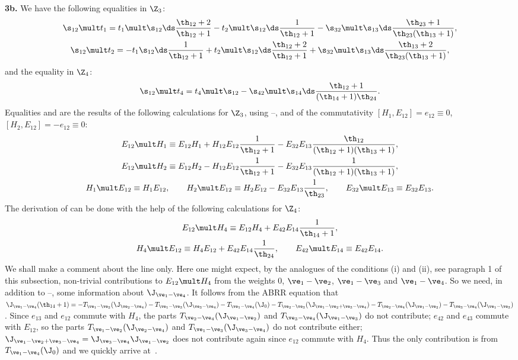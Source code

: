 {\bf 3b.} We have the following equalities in $\Z_3$:
\begin{gather}\label{proof15}
\s_{12}\mult t_1=t_1\mult\s_{12}  {\ds\frac{\th_{12}+2}{\th_{12}+1}}-t_2\mult\s_{12}  {\ds\frac{1}{\th_{12}+1}}
-\s_{32}\mult\s_{13}  {\ds\frac{\th_{23}+1}{\th_{23}(\th_{13}+1)}}  ,\\
\label{proof16}
\s_{12}\mult t_2=-t_1\s_{12}  {\ds\frac{1}{\th_{12}+1}}+t_2\mult\s_{12}
 {\ds\frac{\th_{12}+2}{\th_{12}+1}}+\s_{32}\mult\s_{13}  {\ds\frac{\th_{13}+2}{\th_{23}(\th_{13}+1)}}  ,
\end{gather}
and the equality in $\Z_4$:
\begin{gather}\label{proof17}
\s_{12}\mult t_4=t_4\mult\s_{12}-\s_{42}\mult\s_{14}  {\ds\frac{\th_{12}+1}{(\th_{14}+1)\th_{24}}}  .
\end{gather}
Equalities  and  are the results of the following calculations for $\Z_3$,
using --, and of the commutativity $[H_1,E_{12}]=e_{12}\equiv 0$,
$[H_2,E_{12}]=-e_{12}\equiv 0$:
\begin{gather*}E_{12}\mult H_1 \equiv E_{12}H_1+H_{12}E_{12}  \frac{1}{\th_{12}+1}-
E_{32}E_{13}  \frac{\th_{12}}{(\th_{12}+1)(\th_{13}+1)}  , \\
 E_{12}\mult H_2 \equiv E_{12}H_2-H_{12}E_{12}  \frac{1}{\th_{12}+1}-
E_{32}E_{13}  \frac{1}{(\th_{12}+1)(\th_{13}+1)}, \\
 H_1\mult E_{12} \equiv H_1E_{12}  , \qquad
 H_2\mult E_{12} \equiv H_2E_{12}-E_{32}E_{13}  \frac{1}{\th_{23}} , \qquad
 E_{32}\mult E_{13} \equiv E_{32}E_{13}  .\end{gather*}
The derivation of  can be done with the help of the following calculations for $\Z_4$:
\begin{gather}\label{pr14n}
E_{12}\mult H_4 \equiv E_{12}H_4+E_{42}E_{14}  \frac{1}{\th_{14}+1},\\
 H_4\mult E_{12} \equiv H_4E_{12}+E_{42}E_{14}  \frac{1}{\th_{24}}  ,\qquad
 E_{42}\mult E_{14} \equiv E_{42}E_{14}  .\nonumber
 \end{gather}
We shall make a comment about the line  only. Here one might expect, by  the analogues of the conditions (i) and (ii), see paragraph 1 of this subsection,
non-trivial contributions to $E_{12}\mult H_4$ from the weights 0, $\ve_1-\ve_2$, $\ve_1-\ve_3$ and $\ve_1-\ve_4$.
So we need, in addition to --, some information about
$\J_{\ve_1-\ve_4}$. It follows from the ABRR equation that $\J_{\ve_1-\ve_4}(\th_{14}+1)=-T_{\ve_1-\ve_2}(\J_{\ve_2-\ve_4})
-T_{\ve_1-\ve_3}(\J_{\ve_3-\ve_4})-T_{\ve_1-\ve_4}(\J_0)-T_{\ve_2-\ve_3}(\J_{\ve_1-\ve_2+\ve_3-\ve_4})-
T_{\ve_2-\ve_4}(\J_{\ve_1-\ve_2})-T_{\ve_3-\ve_4}(\J_{\ve_1-\ve_3})$. Since $e_{13}$ and $e_{12}$
commute with $H_4$, the parts $T_{\ve_2-\ve_4}(\J_{\ve_1-\ve_2})$ and $T_{\ve_3-\ve_4}(\J_{\ve_1-\ve_3})$
do not contribute; $e_{42}$ and $e_{43}$ commute with $E_{12}$, so the parts  $T_{\ve_1-\ve_2}(\J_{\ve_2-\ve_4})$
and $T_{\ve_1-\ve_3}(\J_{\ve_3-\ve_4})$ do not contribute either; $\J_{\ve_1-\ve_2+\ve_3-\ve_4}=
\J_{\ve_3-\ve_4}\J_{\ve_1-\ve_2}$ does not contribute again since $e_{12}$ commute with $H_4$.
Thus the only contribution is from $T_{\ve_1-\ve_4}(\J_0)$ and we quickly arrive at~.


